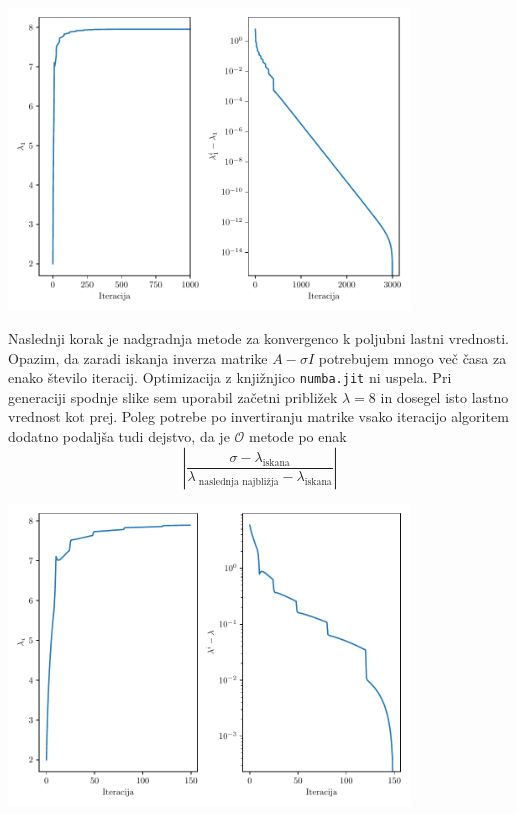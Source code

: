 \begin{center}
    \includegraphics[width=0.8\textwidth]{../old/1-0-powermethod.pdf}
\end{center}

Naslednji korak je nadgradnja metode za konvergenco k poljubni lastni vrednosti. Opazim, da zaradi iskanja inverza matrike $A - \sigma I$ potrebujem mnogo več časa za enako število iteracij. Optimizacija z knjižnjico \texttt{numba.jit} ni uspela.  Pri generaciji spodnje slike sem uporabil začetni približek $\lambda = 8$ in dosegel isto lastno vrednost kot prej. Poleg potrebe po invertiranju matrike vsako iteracijo algoritem dodatno podaljša tudi dejstvo, da je $\mathcal{O}$ metode po \cite{wiki} enak
\[\left| \frac{\sigma - \lambda_{\text{iskana}}}{\lambda_{\text{ naslednja najbližja}} - \lambda_{\text{iskana}}} \right|\]

\begin{center}
    \includegraphics[width=0.8\textwidth]{../old/1-0-inverse_powermethod.pdf}
\end{center}

